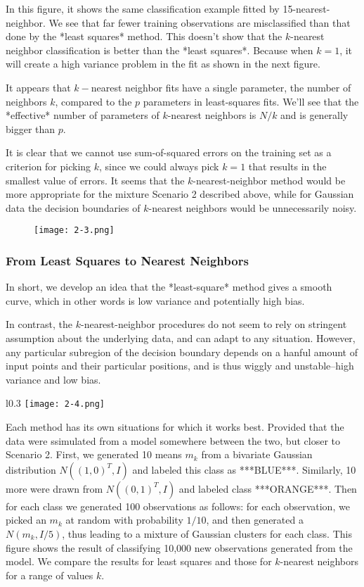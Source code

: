 In this figure, it shows the same classification example fitted by 15-nearest-neighbor. We see that far fewer training observations are misclassified than that done by the *least squares* method. This doesn't show that the $k$-nearest neighbor classification is better than the *least squares*. Because when $k = 1$, it will create a high variance problem in the fit as shown in the next figure.


It appears that $k-$nearest neighbor fits have a single parameter, the number of neighbors $k$, compared to the $p$ parameters in least-squares fits. We'll see that the *effective* number of parameters of $k$-nearest neighbors is $N/k$ and is generally bigger than $p$.

It is clear that we cannot use sum-of-squared errors on the training set as a criterion for picking $k$, since we could always pick $k=1$ that results in the smallest value of errors. It seems that the $k$-nearest-neighbor method would be more appropriate for the mixture Scenario 2 described above, while for Gaussian data the decision boundaries of $k$-nearest neighbors would be unnecessarily noisy.

\begin{figure}
	\centering
	\texttt{[image: 2-3.png]}
	\caption{}
\end{figure}

\subsubsection{From Least Squares to Nearest Neighbors}
In short, we develop an idea that the *least-square* method gives a smooth curve, which in other words is low variance and potentially high bias.

In contrast, the $k$-nearest-neighbor procedures do not seem to rely on stringent assumption about the underlying data, and can adapt to any situation. However, any particular subregion of the decision boundary depends on a hanful amount of input points and their particular positions, and is thus wiggly and unstable--high variance and low bias.

\begin{wrapfigure}{l}{0.3\textwidth}
	\centering
	\texttt{[image: 2-4.png]}
	\caption{}
\end{wrapfigure}

Each method has its own situations for which it works best. Provided that the data were ssimulated from a model somewhere between the two, but closer to Scenario 2. First, we generated 10 means $m_k$ from a bivariate Gaussian distribution $N((1,0)^T,I)$ and labeled this class as ***BLUE***. Similarly, 10 more were drawn from $N((0,1)^T,I)$ and labeled class ***ORANGE***. Then for each class we generated 100 observations as follows: for each observation, we picked an $m_k$ at random with probability $1/10$, and then generated a $N(m_k,I/5)$, thus leading to a mixture of Gaussian clusters for each class. This figure shows the result of classifying 10,000 new observations generated from the model. We compare the results for least squares and those for $k$-nearest neighbors for a range of values $k$.

